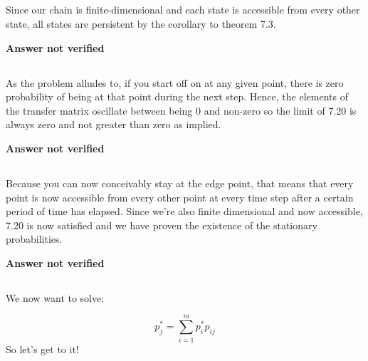 \subsection{}
Since our chain is finite-dimensional and each state is accessible from every other state, all states are persistent by the corollary to theorem 7.3.

\textbf{Answer not verified}

\subsection{}
As the problem alludes to, if you start off on at any given point, there is zero probability of being at that point during the next step.  Hence, the elements of the transfer matrix oscillate between being 0 and non-zero so the limit of 7.20 is always zero and not greater than zero as implied.

\textbf{Answer not verified}


\subsection{}

Because you can now conceivably stay at the edge point, that means that every point is now accessible from every other point at every time step after a certain period of time has elapsed.  Since we're also finite dimensional and now accessible, 7.20 is now satisfied and we have proven the existence of the stationary probabilities.

\textbf{Answer not verified}

\subsection{}

We now want to solve:

\begin{equation}
	p_j^* = \sum_{i=1}^{m} p_i^* p_{ij}
\end{equation}
So let's get to it!

